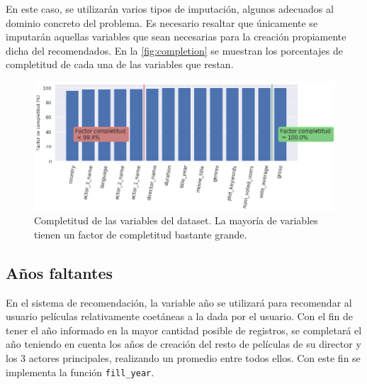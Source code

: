 En este caso, se utilizarán varios tipos de imputación, algunos adecuados al dominio concreto del problema. Es necesario resaltar que únicamente se imputarán aquellas variables que sean necesarias para la creación propiamente dicha del recomendados. En la \autoref{fig:completion} se muestran los porcentajes de completitud de cada una de las variables que restan.

\begin{figure}[H]
    \centering
    \captionsetup{width=12cm}
    \includegraphics[width= 13cm]{./contenido/imagenes/completion.png}
\caption{Completitud de las variables del dataset. La mayoría de variables tienen un factor de completitud bastante grande.}
\label{fig:completion}
\end{figure}


\subsection{Años faltantes}

En el sistema de recomendación, la variable año se utilizará para recomendar al usuario películas relativamente coetáneas a la dada por el usuario. Con el fin de tener el año informado en la mayor cantidad posible de registros, se completará el año teniendo en cuenta los años de creación del resto de películas de su director y los 3 actores principales, realizando un promedio entre todos ellos. Con este fin se implementa la función \texttt{fill\_year}.

